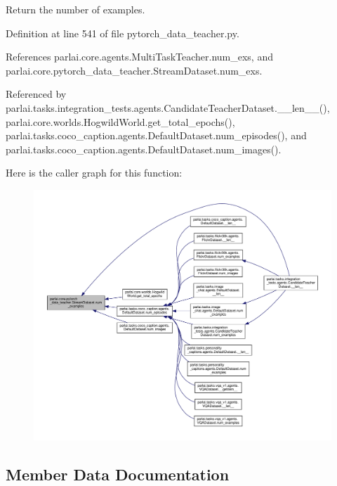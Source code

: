 \begin{DoxyVerb}Return the number of examples.\end{DoxyVerb}
 

Definition at line 541 of file pytorch\+\_\+data\+\_\+teacher.\+py.



References parlai.\+core.\+agents.\+Multi\+Task\+Teacher.\+num\+\_\+exs, and parlai.\+core.\+pytorch\+\_\+data\+\_\+teacher.\+Stream\+Dataset.\+num\+\_\+exs.



Referenced by parlai.\+tasks.\+integration\+\_\+tests.\+agents.\+Candidate\+Teacher\+Dataset.\+\_\+\+\_\+len\+\_\+\+\_\+(), parlai.\+core.\+worlds.\+Hogwild\+World.\+get\+\_\+total\+\_\+epochs(), parlai.\+tasks.\+coco\+\_\+caption.\+agents.\+Default\+Dataset.\+num\+\_\+episodes(), and parlai.\+tasks.\+coco\+\_\+caption.\+agents.\+Default\+Dataset.\+num\+\_\+images().

Here is the caller graph for this function\+:
\nopagebreak
\begin{figure}[H]
\begin{center}
\leavevmode
\includegraphics[width=350pt]{classparlai_1_1core_1_1pytorch__data__teacher_1_1StreamDataset_a4f2bbfd2bc046d8ff2f59153eec79b46_icgraph}
\end{center}
\end{figure}


\subsection{Member Data Documentation}
\mbox{\label{classparlai_1_1core_1_1pytorch__data__teacher_1_1StreamDataset_a632ed3ae104c8cee00730e9f1f827cc4}} 

